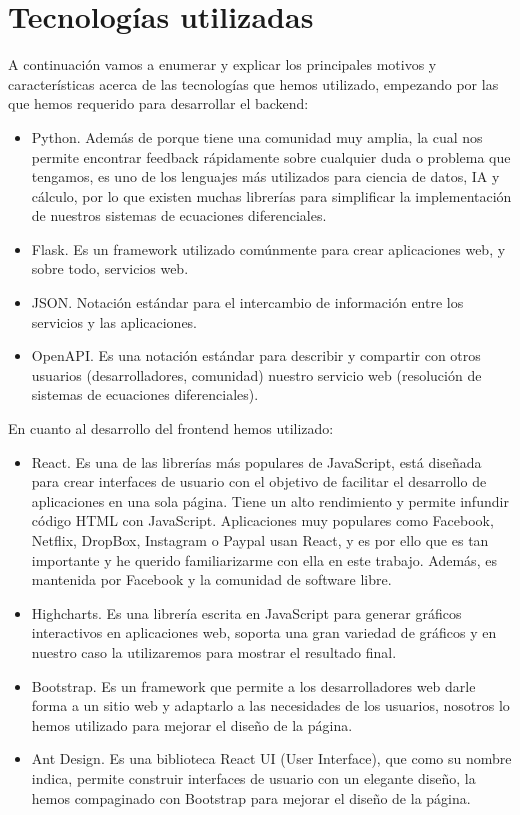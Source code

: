 \section{Tecnologías utilizadas}
A continuación vamos a enumerar y explicar los principales motivos y características acerca de las tecnologías que hemos utilizado, empezando por las que hemos requerido para desarrollar el backend:
\begin{itemize}
	\item Python. Además de porque tiene una comunidad muy amplia, la cual nos permite encontrar feedback rápidamente sobre cualquier duda o problema que tengamos, es uno de los lenguajes más utilizados para ciencia de datos, IA y cálculo, por lo que existen muchas librerías para simplificar la implementación de nuestros sistemas de ecuaciones diferenciales.
	\item Flask. Es un framework utilizado comúnmente para crear aplicaciones web, y sobre todo, servicios web.
	\item JSON. Notación estándar para el intercambio de información entre los servicios y las aplicaciones.
	\item OpenAPI. Es una notación estándar para describir y compartir con otros usuarios (desarrolladores, comunidad) nuestro servicio web (resolución de sistemas de ecuaciones diferenciales).
\end{itemize}
En cuanto al desarrollo del frontend hemos utilizado:
\begin{itemize}
	\item React. Es una de las librerías más populares de JavaScript, está diseñada para crear interfaces de usuario con el objetivo de facilitar el desarrollo de aplicaciones en una sola página. Tiene un alto rendimiento y permite infundir código HTML con JavaScript. Aplicaciones muy populares como Facebook, Netflix, DropBox, Instagram o Paypal usan React, y es por ello que es tan importante y he querido familiarizarme con ella en este trabajo. Además, es mantenida por Facebook y la comunidad de software libre.
	\item Highcharts. Es una librería escrita en JavaScript para generar gráficos interactivos en aplicaciones web, soporta una gran variedad de gráficos y en nuestro caso la utilizaremos para mostrar el resultado final.
	\item Bootstrap. Es un framework que permite a los desarrolladores web darle forma a un sitio web y adaptarlo a las necesidades de los usuarios, nosotros lo hemos utilizado para mejorar el diseño de la página.
	\item Ant Design. Es una biblioteca React UI (User Interface), que como su nombre indica, permite construir interfaces de usuario con un elegante diseño, la hemos compaginado con Bootstrap para mejorar el diseño de la página.
\end{itemize}
